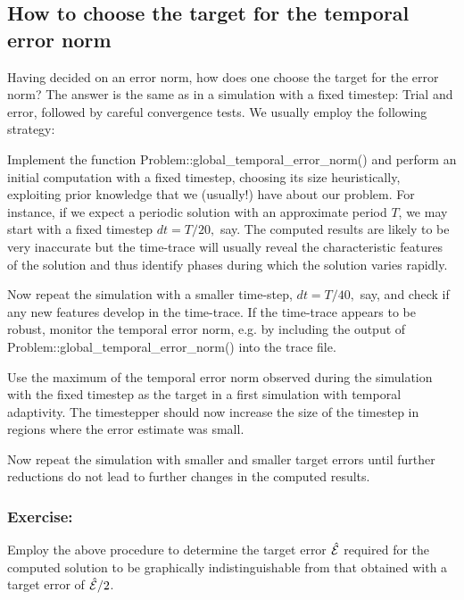 \hypertarget{index_norm}{}\subsection{How to choose the target for the temporal error norm}\label{index_norm}
Having decided on an error norm, how does one choose the target for the error norm? The answer is the same as in a simulation with a fixed timestep\+: Trial and error, followed by careful convergence tests. We usually employ the following strategy\+:
\begin{DoxyItemize}
\item Implement the function {\ttfamily Problem\+::global\+\_\+temporal\+\_\+error\+\_\+norm()} and perform an initial computation with a fixed timestep, choosing its size heuristically, exploiting prior knowledge that we (usually!) have about our problem. For instance, if we expect a periodic solution with an approximate period $ T $, we may start with a fixed timestep $ dt = T/20,$ say. The computed results are likely to be very inaccurate but the time-\/trace will usually reveal the characteristic features of the solution and thus identify phases during which the solution varies rapidly.
\item Now repeat the simulation with a smaller time-\/step, $ dt = T/40,$ say, and check if any new features develop in the time-\/trace. If the time-\/trace appears to be robust, monitor the temporal error norm, e.\+g. by including the output of {\ttfamily Problem\+::global\+\_\+temporal\+\_\+error\+\_\+norm()} into the trace file.
\item Use the maximum of the temporal error norm observed during the simulation with the fixed timestep as the target in a first simulation with temporal adaptivity. The timestepper should now increase the size of the timestep in regions where the error estimate was small.
\item Now repeat the simulation with smaller and smaller target errors until further reductions do not lead to further changes in the computed results.
\end{DoxyItemize}\hypertarget{index_ex}{}\subsubsection{Exercise\+:}\label{index_ex}
Employ the above procedure to determine the target error $ \hat{\cal E}$ required for the computed solution to be graphically indistinguishable from that obtained with a target error of $ \hat{\cal E}/2$.



